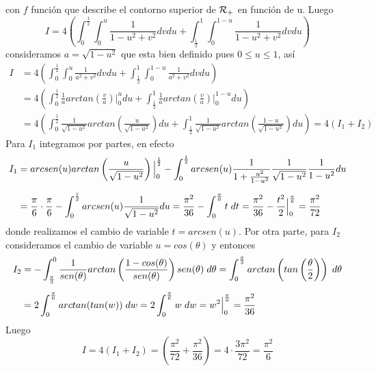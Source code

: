 \documentclass{article}
\begin{document}
con $f$ función que describe el contorno superior de $\mathcal{R}_{+}$ en función de u. Luego
\begin{equation*}
    I=4\left(\int_{0}^{\frac{1}{2}}\int_{0}^{u}\frac{1}{1-u^{2}+v^{2}}dvdu
    +\int_{\frac{1}{2}}^{1}\int_{0}^{1-u}\frac{1}{1-u^{2}+v^{2}}dvdu\right)
\end{equation*}
consideramos $a=\sqrt{1-u^{2}}$ que esta bien definido pues $0\leq u\leq1$, así
\begin{align*}
    I &= 4\left(\int_{0}^{\frac{1}{2}}\int_{0}^{u}\frac{1}{a^{2}+v^{2}}dvdu
    +\int_{\frac{1}{2}}^{1}\int_{0}^{1-u}\frac{1}{a^{2}+v^{2}}dvdu\right) \\[2mm]
    &= 4\left(\int_{0}^{\frac{1}{2}}\frac{1}{a}arctan\left(\frac{v}{a}\right)\Big|_{0}^{u}du
    +\int_{\frac{1}{2}}^{1}\frac{1}{a}arctan\left(\frac{v}{a}\right)\Big|_{0}^{1-u}du
    \right) \\[2mm]
    &= 4\left(\int_{0}^{\frac{1}{2}}\frac{1}{\sqrt{1-u^{2}}}arctan\left(\frac{u}{\sqrt{1-u^{2}}}
    \right)du+\int_{\frac{1}{2}}^{1}\frac{1}{\sqrt{1-u^{2}}}arctan\left(\frac{1-u}{\sqrt{1-u^{2}}}
    \right)du\right)=4(I_{1}+I_{2})
\end{align*}
Para $I_{1}$ integramos por partes, en efecto
\begin{align*}
    I_{1} &= arcsen(u)arctan\left(\frac{u}{\sqrt{1-u^{2}}}\right)\Big|_{0}^{\frac{1}{2}}
    -\int_{0}^{\frac{1}{2}}arcsen(u)\frac{1}{1+\frac{u^{2}}{1-u^{2}}}\frac{1}{\sqrt{1-u^{2}}}
    \frac{1}{1-u^{2}}du \\[2mm]
    &=\frac{\pi}{6}\cdot\frac{\pi}{6}-\int_{0}^{\frac{1}{2}}arcsen(u)\frac{1}{\sqrt{1-u^{2}}}du
    =\frac{\pi^{2}}{36}-\int_{0}^{\frac{\pi}{6}}t\hspace{1mm}dt=\frac{\pi^{2}}{36}
    -\frac{t^{2}}{2}\Big|_{0}^{\frac{\pi}{6}}=\frac{\pi^{2}}{72}
\end{align*}
donde realizamos el cambio de variable $t=arcsen(u)$. Por otra parte, para $I_{2}$ consideramos el
cambio de variable $u=cos(\theta)$ y entonces
\begin{align*}
    I_{2} &= -\int_{\frac{\pi}{3}}^{0}\frac{1}{sen(\theta)}arctan\left(
    \frac{1-cos(\theta)}{sen(\theta)}\right)sen(\theta)\hspace{1mm}d\theta
    =\int_{0}^{\frac{\pi}{3}}arctan\left(tan\left(\frac{\theta}{2}\right)\right)
    \hspace{1mm}d\theta \\[2mm]
    &= 2\int_{0}^{\frac{\pi}{6}}arctan(tan(w))\hspace{1mm}dw
    =2\int_{0}^{\frac{\pi}{6}}w\hspace{1mm}dw=w^{2}\Big|_{0}^{\frac{\pi}{6}}=\frac{\pi^{2}}{36}
\end{align*}
Luego
\begin{equation*}
    I=4(I_{1}+I_{2})=\left(\frac{\pi^{2}}{72}+\frac{\pi^{2}}{36}\right)=4\cdot\frac{3\pi^{2}}{72}
    =\frac{\pi^{2}}{6}
\end{equation*}
\end{document}
